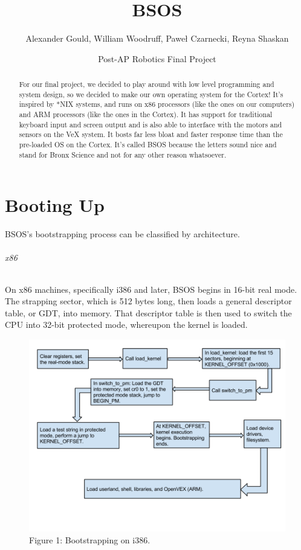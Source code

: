 \documentclass[english]{article}
\begin{document}
\title{BSOS}


\author{Alexander Gould, William Woodruff, Pawe\l{} Czarnecki, Reyna Shaskan}


\date{Post-AP Robotics Final Project}
\maketitle
\begin{abstract}
For our final project, we decided to play around with low level programming
and system design, so we decided to make our own operating system
for the Cortex! It's inspired by {*}NIX systems, and runs on x86 processors
(like the ones on our computers) and ARM processors (like the ones
in the Cortex). It has support for traditional keyboard input and
screen output and is also able to interface with the motors and sensors
on the VeX system. It bosts far less bloat and faster response time
than the pre-loaded OS on the Cortex. It's called BSOS because the
letters sound nice and stand for Bronx Science and not for any other reason whatsoever.
\end{abstract}

\part{Booting Up}
BSOS's bootstrapping process can be classified by architecture. 

\paragraph{x86}
On x86 machines, specifically i386 and later, BSOS begins in 16-bit real mode. The strapping sector, which is 512 bytes long, then loads a general descriptor table, or GDT, into memory. That descriptor table is then used to switch the CPU into 32-bit protected mode, whereupon the kernel is loaded.
\begin{figure}[h!]
\centerline{\includegraphics[scale=0.4]{imgs/boot_x86.png}}
\caption{Figure 1: Bootstrapping on i386.}
\end{figure}
\end{document}
